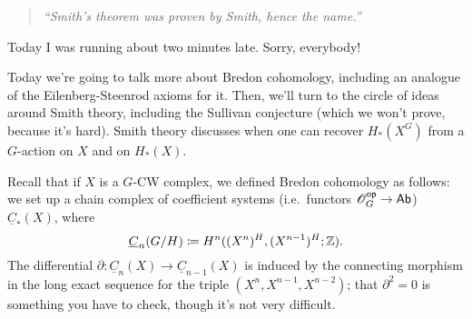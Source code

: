 \begin{quote}\textit{
	``Smith's theorem was proven by Smith, hence the name.''
}\end{quote}
Today I was running about two minutes late. Sorry, everybody!

Today we're going to talk more about Bredon cohomology, including an analogue of the Eilenberg-Steenrod axioms for
it. Then, we'll turn to the circle of ideas around Smith theory, including the Sullivan conjecture (which we won't
prove, because it's hard). Smith theory discusses when one can recover $H_*(X^G)$ from a $G$-action on $X$ and on
$H_*(X)$.

Recall that if $X$ is a $G$-CW complex, we defined Bredon cohomology as follows: we set up a chain complex of
coefficient systems (i.e.\ functors $\mathscr O_G^{\mathsf{op}}\to\mathsf{Ab}$) $\underline C_*(X)$, where
\[\underline C_n(G/H)\coloneqq H^n((X^n)^H, (X^{n-1})^H; \mathbb Z).\]
The differential $\partial:\underline C_n(X)\to\underline C_{n-1}(X)$ is induced by the connecting morphism in the
long exact sequence for the triple $(X^n, X^{n-1}, X^{n-2})$; that $\partial^2 = 0$ is something you have to check,
though it's not very difficult.

